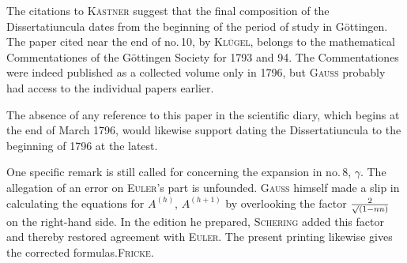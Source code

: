 The citations to \textsc{Kästner} suggest that the final composition of the Dissertatiuncula dates from the beginning of the period of study in Göttingen. The paper cited near the end of no.\,10, by \textsc{Klügel}, belongs to the mathematical Commentationes of the Göttingen Society for 1793 and 94. The Commentationes were indeed published as a collected volume only in 1796, but \textsc{Gauss} probably had access to the individual papers earlier.

The absence of any reference to this paper in the scientific diary, which begins at the end of March 1796, would likewise support dating the Dissertatiuncula to the beginning of 1796 at the latest.

One specific remark is still called for concerning the expansion in no.\,8, $\gamma$. The allegation of an error on \textsc{Euler}'s part is unfounded. \textsc{Gauss} himself made a slip in calculating the equations for $A^{(h)}$, $A^{(h+1)}$ by overlooking the factor $\frac{2}{\mathord{\surd}(1-nn)}$ on the right-hand side. In the edition he prepared, \textsc{Schering} added this factor and thereby restored agreement with \textsc{Euler}. The present printing likewise gives the corrected formulas.\hfill\textsc{Fricke}.

\par\smallskip\hrulefill\smallskip\par

